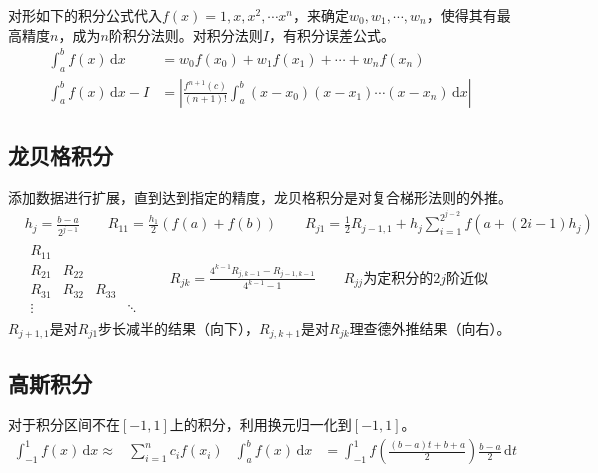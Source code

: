 \documentclass[twocolumn]{article}
\begin{document}
对形如下的积分公式代入$f(x)=1,x,x^2,\cdots x^n$，来确定$w_0,w_1,\cdots,w_n$，使得其有最高精度$n$，成为$n$阶积分法则。对积分法则$I$，有积分误差公式。
\begin{align*}
    \int_{a}^{b} f(x) \,\mathrm{d}x &= w_0f(x_0)+w_1f(x_1)+\cdots+w_nf(x_n)\\
    \int_{a}^{b} f(x) \,\mathrm{d}x - I &= \left| \frac{f^{n+1}(c)}{(n+1)!}\int_{a}^{b} (x-x_0)(x-x_1)\cdots(x-x_n) \,\mathrm{d}x  \right|
\end{align*}

\subsection{龙贝格积分}
添加数据进行扩展，直到达到指定的精度，龙贝格积分是对复合梯形法则的外推。
\begin{align*}
    &h_j=\frac{b-a}{2^{j-1}} \qquad R_{11}=\frac{h_1}{2}(f(a)+f(b)) \qquad R_{j1}=\frac{1}{2}R_{j-1,1}+h_j\sum_{i=1}^{2^{j-2}}f(a+(2i-1)h_j)\\
     & \begin{matrix}
        R_{11} &        &        &\\
        R_{21} & R_{22} &        &\\
        R_{31} & R_{32} & R_{33}&\\
        \vdots&&&\ddots
    \end{matrix}
    \qquad R_{jk}=\frac{4^{k-1}R_{j,k-1}-R_{j-1,k-1}}{4^{k-1}-1} \qquad R_{jj}\text{为定积分的}2j\text{阶近似}
\end{align*}
$R_{j+1,1}$是对$R_{j1}$步长减半的结果（向下），$R_{j,k+1}$是对$R_{jk}$理查德外推结果（向右）。

\subsection{高斯积分}
对于积分区间不在$[-1,1]$上的积分，利用换元归一化到$[-1,1]$。
\begin{align*}
    \int_{-1}^{1} f(x) \,\mathrm{d}x \approx & \sum_{i=1}^{n}c_if(x_i) & \int_{a}^{b} f(x) \,\mathrm{d}x & = \int_{-1}^{1} f\left( \frac{(b-a)t+b+a}{2} \right)\frac{b-a}{2} \,\mathrm{d}t
\end{align*}
\end{document}
